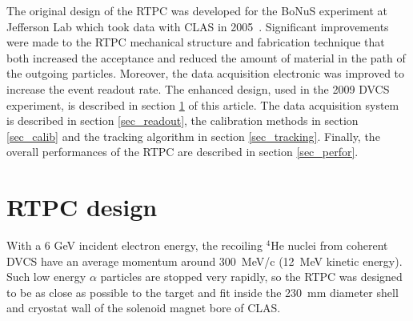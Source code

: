 \documentclass[preprint,5p]{elsarticle}
\begin{document}
The original design of the RTPC was developed for the BoNuS 
experiment at Jefferson Lab which took data with CLAS in 
2005~\cite{Fenker:2008zz}. Significant improvements were made to the RTPC mechanical 
structure and fabrication technique that both increased the acceptance and 
reduced the amount of material in the path of the outgoing particles. 
Moreover, the data acquisition electronic was improved to increase the event 
readout rate. The enhanced design, 
used in the 2009 DVCS experiment, is described in section \ref{sec_design} of 
this article. The data acquisition system is described in section \ref{sec_readout}, 
the calibration methods in section \ref{sec_calib} and the tracking algorithm in section
\ref{sec_tracking}. Finally, the overall performances
of the RTPC are described in section \ref{sec_perfor}.

\section{RTPC design} \label{sec_design}

With a 6 GeV incident electron energy, the recoiling $^{4}$He nuclei from 
coherent DVCS have an average momentum around 300~MeV/c (12~MeV kinetic 
energy). Such low energy $\alpha$ particles are stopped very rapidly, so the 
RTPC was designed to be as close as possible to the target and fit inside the 
230~mm diameter shell and cryostat wall of the solenoid magnet bore of CLAS.
\end{document}
